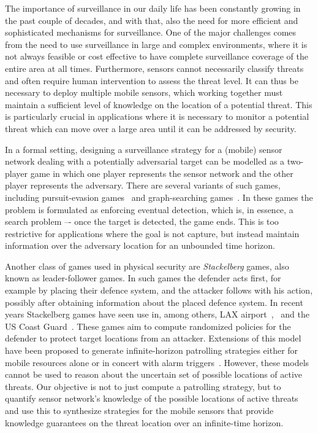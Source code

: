 The importance of surveillance in our daily life has been constantly growing in the past couple of decades, and with that, also the need for more efficient and sophisticated mechanisms for surveillance. One of the major challenges comes from the need to use surveillance in large and complex environments, where it is not always feasible or cost effective to have complete surveillance coverage of the entire area at all times. Furthermore, sensors cannot necessarily classify threats and often require human intervention to assess the threat level. It can thus be necessary to deploy multiple mobile sensors, which working together must maintain a sufficient level of knowledge on the location of a potential threat. This is particularly crucial in applications where it is necessary to monitor a potential threat which can move over a large area until it can be addressed by security.

In a formal setting, designing a surveillance strategy for a (mobile) sensor network dealing with a potentially adversarial target can be modelled as a two-player game in which one player represents the sensor network and the other player represents the adversary. There are several variants of such games, including pursuit-evasion games~\cite{Chung2011} and graph-searching games~\cite{Kreutzer11}. In these games the problem is formulated as enforcing eventual detection, which is, in essence, a search problem –- once the target is detected, the game ends. This is too restrictive for applications where the goal is not capture, but instead maintain information over the adversary location for an unbounded time horizon.

Another class of games used in physical security are \emph{Stackelberg} games, also known as leader-follower games. In such games the defender acts first, for example by placing their defence system, and the attacker follows with his action, possibly after obtaining information about the placed defence system. In recent years Stackelberg games have seen use in, among others, LAX airport~\cite{Pita08},~\cite{jain2012overview} and the US Coast Guard~\cite{An11}. These games aim to compute randomized policies for the defender to protect target locations from an attacker. Extensions of this model~\cite{Basilico12} have been proposed to generate infinite-horizon patrolling strategies either for mobile resources alone or in concert with alarm triggers~\cite{basilico2016security,Munoz13}. However, these models cannot be used to reason about the uncertain set of possible  locations of active threats. Our objective is not to just compute a patrolling strategy, but to quantify sensor network's knowledge of the possible locations of active threats and use this to synthesize strategies for the mobile sensors that provide knowledge guarantees on the threat location over an infinite-time horizon.

